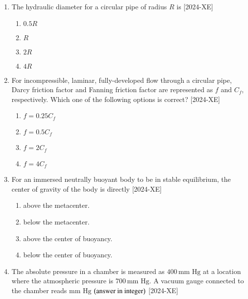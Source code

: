 \documentclass[journal]{IEEEtran}
\begin{document}
\begin{enumerate}[start=27]
\item The hydraulic diameter for a circular pipe of radius $R$ is \hfill{[2024-XE]}\\
\begin{enumerate}
    \item $0.5R$\\
    \item $R$\\
    \item $2R$\\
    \item $4R$\\
\end{enumerate}

\item For incompressible, laminar, fully-developed flow through a circular pipe, Darcy friction factor and Fanning friction factor are represented as $f$ and $C_{f}$, respectively. Which one of the following options is correct? \hfill{[2024-XE]}\\
\begin{enumerate}
    \item $f=0.25 C_{f}$\\
    \item $f=0.5 C_{f}$\\
    \item $f=2 C_{f}$\\
    \item $f=4 C_{f}$\\
\end{enumerate}

\item For an immersed neutrally buoyant body to be in stable equilibrium, the center of gravity of the body is directly \hfill{[2024-XE]}\\
\begin{enumerate}
    \item above the metacenter.\\
    \item below the metacenter.\\
    \item above the center of buoyancy.\\
    \item below the center of buoyancy.\\
\end{enumerate}

\item The absolute pressure in a chamber is measured as $400 \, \text{mm Hg}$ at a location where the atmospheric pressure is $700 \, \text{mm Hg}$. A vacuum gauge connected to the chamber reads \underline{\hspace{1cm}} $\text{mm Hg}$ $\left(\text{answer in integer}\right)$ \hfill{[2024-XE]}\\


\end{enumerate}
\end{document}
